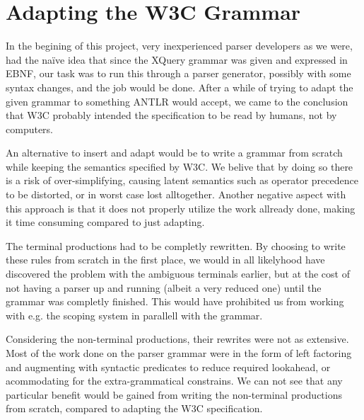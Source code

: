 \section{Adapting the W3C Grammar}
\label{sect:discussion:adaptW3C}

In the begining of this project, very inexperienced parser developers as we
were, had the na\"{i}ve idea that since the XQuery grammar was given and
expressed in EBNF, our task was to run this through a parser generator,
possibly with some syntax changes, and the job would be done. After a while of
trying to adapt the given grammar to something ANTLR would accept, we came to
the conclusion that W3C probably intended the specification to be read by
humans, not by computers. 

An alternative to insert and adapt would be to write a grammar from scratch while keeping the semantics specified by W3C. We belive that by doing so there is a risk of over-simplifying, causing latent semantics such as operator precedence to be distorted, or in worst case lost alltogether. Another negative aspect with this approach is that it does not properly utilize the work allready done, making it time consuming compared to just adapting.

The terminal productions had to be completly rewritten. By choosing to write these rules from scratch in the first place, we would in all likelyhood have discovered the problem with the ambiguous terminals earlier, but at the cost of not having a parser up and running (albeit a very reduced one) until the grammar was completly finished. This would have prohibited us from working with e.g. the scoping system in parallell with the grammar.

Considering the non-terminal productions, their rewrites were not as extensive. Most of the work done on the parser grammar were in the form of left factoring and augmenting with syntactic predicates to reduce required lookahead, or acommodating for the extra-grammatical constrains. We can not see that any particular benefit would be gained from writing the non-terminal productions from scratch, compared to adapting the W3C specification.